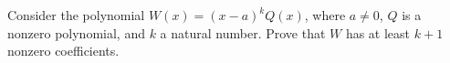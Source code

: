 Consider the polynomial $W(x) = (x - a)^kQ(x)$, where $a \neq 0$, $Q$ is a nonzero polynomial, and $k$ a natural number. Prove that $W$ has at least $k + 1$ nonzero coefficients.